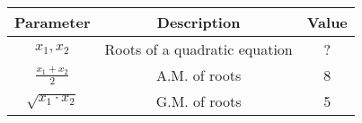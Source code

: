   \begin{tabular}{|c|c|c|}
        \hline
        \textbf{Parameter} & \textbf{Description} & \textbf{Value} \\
        \hline
        $ x_1, x_2 $ & Roots of a quadratic equation & ?  \\
        \hline
        $\frac{x_1 + x_2}{2}$& A.M. of roots & 8 \\
        \hline
        $\sqrt{x_1 \cdot x_2}$& G.M. of roots & 5 \\
        \hline
    \end{tabular}

